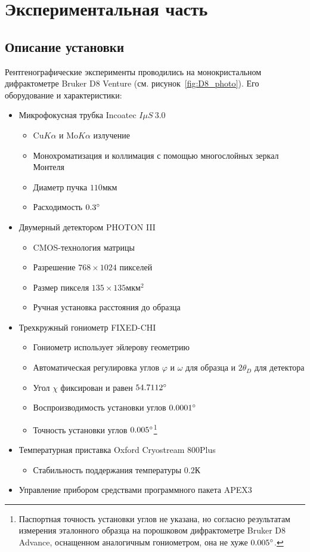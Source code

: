 \section{Экспериментальная часть}
\subsection{Описание установки}
Рентгенографические эксперименты проводились на монокристальном дифрактометре Bruker D8 Venture (см. рисунок~\ref{fig:D8_photo}).
Его оборудование и характеристики:
\begin{itemize}
    \item Микрофокусная трубка Incoatec $I \mu S \ 3.0$
    \begin{itemize}
        \item $\text{Cu} K\alpha$ и $\text{Mo} K\alpha$ излучение
        \item Монохроматизация и коллимация с помощью многослойных зеркал Монтеля
        \item Диаметр пучка $110\unit{мкм}$
        \item Расходимость $0.3^\circ$
    \end{itemize}
    \item Двумерный детектором PHOTON III
    \begin{itemize}
        \item CMOS-технология матрицы
        \item Разрешение $768 \times 1024$ пикселей
        \item Размер пикселя $135 \times 135\unit{мкм}^2$
        \item Ручная установка расстояния до образца
    \end{itemize}
    \item Трехкружный гониометр FIXED-CHI
    \begin{itemize}
        \item Гониометр использует эйлерову геометрию
        \item Автоматическая регулировка углов $\varphi$ и $\omega$ для образца и $2\theta_D$ для детектора
        \item Угол $\chi$ фиксирован и равен $54.7112^\circ$
        \item Воспроизводимость установки углов $0.0001^\circ$
        \item Точность установки углов $0.005^\circ$\footnote{Паспортная точность установки углов не указана, но согласно результатам измерения эталонного образца на порошковом дифрактометре Bruker D8 Advance, оснащенном аналогичным гониометром, она не хуже $0.005^\circ$.}
    \end{itemize}
    \item Температурная приставка Oxford Cryostream 800Plus
    \begin{itemize}
            \item Стабильность поддержания температуры $0.2\unit{К}$
    \end{itemize}
    \item Управление прибором средствами программного пакета APEX3~\cite{Bruker:2019}
\end{itemize}

